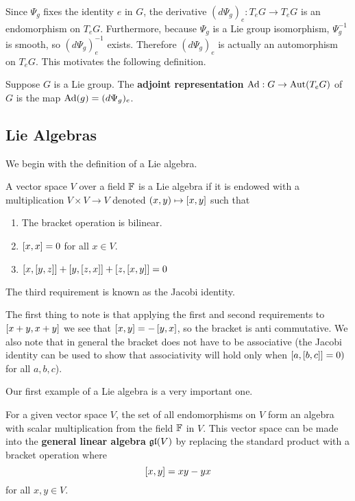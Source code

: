\documentclass[a4paper]{article}
\begin{document}
Since $\Psi_g$ fixes the identity $e$ in $G$, the derivative $(d\Psi_g)_e : T_e G \to T_e G$ is an endomorphism on $T_e G$. Furthermore, because $\Psi_g$ is a Lie group isomorphism, $\Psi_g^{-1}$ is smooth, so $(d\Psi_g)^{-1}_e$ exists. Therefore $(d\Psi_g)_e$ is actually an automorphism on $T_e G$. This motivates the following definition.

\begin{defi}
    Suppose $G$ is a Lie group. The \textbf{adjoint representation} $\operatorname{Ad}: G \to \operatorname{Aut}(T_e G)$ of $G$ is the map $\operatorname{Ad}(g) = (d\Psi_g)_e$.
\end{defi}

\subsection{Lie Algebras}
We begin with the definition of a Lie algebra.

\begin{defi}
    A vector space $V$ over a field $\mathbb{F}$ is a Lie algebra if it is endowed with a multiplication $V \times V \to V$ denoted $(x, y) \mapsto \left[ x, y \right]$ such that
    \begin{enumerate}
        \item The bracket operation is bilinear.
        \item $\left[ x, x \right] = 0$ for all $x \in V$. 
        \item $\left[ x, \left[ y, z \right] \right] + \left[ y, \left[ z, x \right] \right] + \left[ z, \left[ x, y \right] \right] = 0$
    \end{enumerate}
    The third requirement is known as the Jacobi identity.
\end{defi}

The first thing to note is that applying the first and second requirements to $\left[ x + y, x + y \right]$ we see that $\left[ x, y \right] = -\left[ y, x \right]$, so the bracket is anti commutative. We also note that in general the bracket does not have to be associative (the Jacobi identity can be used to show that associativity will hold only when $\left[ a, \left[ b,c \right] \right] = 0)$ for all $a, b, c$).

Our first example of a Lie algebra is a very important one.

\begin{defi}
    For a given vector space $V$, the set of all endomorphisms on $V$ form an algebra with scalar multiplication from the field $\mathbb{F}$ in $V$. This vector space can be made into the \textbf{general linear algebra} $\mathfrak{gl}(V)$ by replacing the standard product with a bracket operation where $$\left[ x, y \right] = xy - yx$$
    for all $x, y \in V$.
\end{defi}
\end{document}
